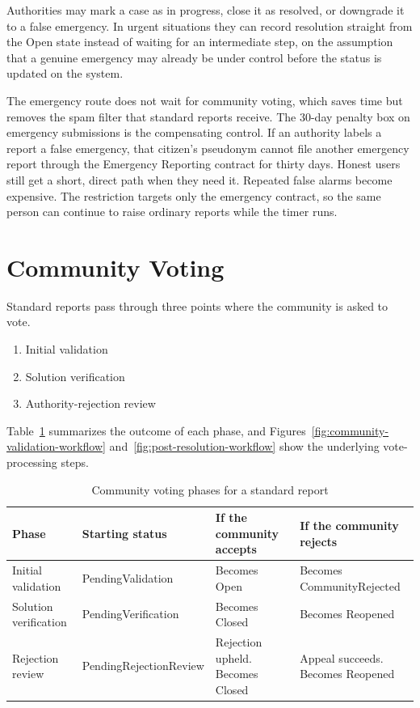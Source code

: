 Authorities may mark a case as in progress, close it as resolved, or downgrade it to a false emergency. In urgent situations they can record resolution straight from the Open state instead of waiting for an intermediate step, on the assumption that a genuine emergency may already be under control before the status is updated on the system.

The emergency route does not wait for community voting, which saves time but removes the spam filter that standard reports receive. The 30-day penalty box on emergency submissions is the compensating control. If an authority labels a report a false emergency, that citizen's pseudonym cannot file another emergency report through the Emergency Reporting contract for thirty days. Honest users still get a short, direct path when they need it. Repeated false alarms become expensive. The restriction targets only the emergency contract, so the same person can continue to raise ordinary reports while the timer runs.

\section{Community Voting}
\label{sec:community-voting}

Standard reports pass through three points where the community is asked to vote.
\begin{enumerate}
    \item Initial validation
    \item Solution verification
    \item Authority-rejection review
\end{enumerate}
Table~\ref{tab:voting-phases} summarizes the outcome of each phase, and Figures~\ref{fig:community-validation-workflow} and~\ref{fig:post-resolution-workflow} show the underlying vote-processing steps.

\begin{table}[!htb]
    \centering
    \caption{Community voting phases for a standard report}
    \label{tab:voting-phases}
    \small
    \begin{tabular}{p{}|p{}|p{}|p{}}
        
        Phase & Starting status & If the community accepts & If the community rejects \\
        \hline
        Initial validation & PendingValidation& Becomes Open& Becomes CommunityRejected\\
        \hline
        Solution verification & PendingVerification& Becomes Closed& Becomes Reopened\\
        \hline
        Rejection review & PendingRejectionReview& Rejection upheld. Becomes Closed& Appeal succeeds. Becomes Reopened\\
        
    \end{tabular}
\end{table}

